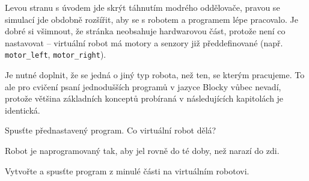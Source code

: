 \documentclass[../main.tex]{subfiles}
\begin{document}
	Levou stranu s úvodem jde skrýt táhnutím modrého oddělovače, pravou se simulací jde obdobně rozšířit, aby se s robotem a programem lépe pracovalo. Je dobré si všimnout, že stránka neobsahuje hardwarovou část, protože není co nastavovat -- virtuální robot má motory a senzory již předdefinované (např. \texttt{motor\_left}, \texttt{motor\_right}).

	Je nutné doplnit, že se jedná o jiný typ robota, než ten, se kterým pracujeme. To ale pro cvičení psaní jednodušších programů v jazyce Blocky vůbec nevadí, protože většina základních konceptů probíraná v následujících kapitolách je identická.

	\begin{question}
		Spusťte přednastavený program. Co virtuální robot dělá?
	\end{question}

	\begin{solution}
		Robot je naprogramovaný tak, aby jel rovně do té doby, než narazí do zdi.
	\end{solution}

	\begin{question}
		Vytvořte a spusťte program z minulé části na virtuálním robotovi.
	\end{question}
\end{document}
